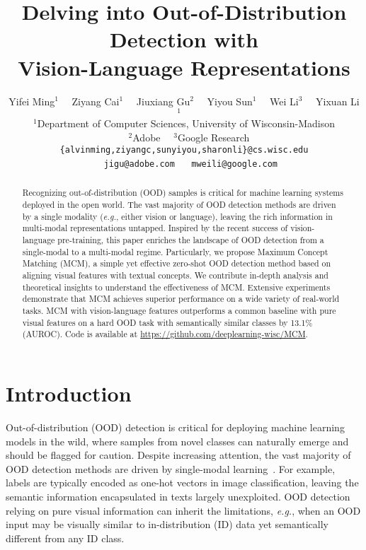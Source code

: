 \documentclass{article}
\title{Delving into Out-of-Distribution Detection with\\ Vision-Language Representations}
\author{Yifei Ming$^1\quad$ Ziyang Cai$^1\quad$ Jiuxiang Gu$^2\quad$  Yiyou Sun$^1\quad$ Wei Li$^3\quad$ Yixuan Li$^1\quad$  \\
  $^1$Department of Computer Sciences, University of Wisconsin-Madison\\ $\quad^2$Adobe $\quad^3$Google Research\\
  \texttt{\{alvinming,ziyangc,sunyiyou,sharonli\}@cs.wisc.edu}\\
 $\quad$ \texttt{jigu@adobe.com} $\quad$ \texttt{mweili@google.com} 
}
\begin{document}
\maketitle

\begin{abstract}
Recognizing out-of-distribution (OOD) samples is critical for machine learning systems deployed in the open world. The vast majority of OOD detection methods are driven by a single modality (\textit{e.g.}, either vision or language), leaving the rich information in multi-modal representations untapped.
Inspired by the recent success of vision-language pre-training, this paper enriches the landscape of OOD detection from a single-modal to a multi-modal regime. Particularly, we propose Maximum Concept Matching (MCM), a simple yet effective zero-shot OOD detection method based on aligning visual features with textual concepts.  We contribute in-depth analysis and theoretical insights to understand the effectiveness of MCM.
Extensive experiments demonstrate that MCM achieves superior performance on a wide variety of real-world tasks. MCM with vision-language features outperforms a common baseline with pure visual features on a hard OOD task with semantically similar classes by 13.1\% (AUROC). Code is available at \url{https://github.com/deeplearning-wisc/MCM}. 
\end{abstract}


\section{Introduction}

Out-of-distribution (OOD) detection is critical for deploying machine learning models in the wild, where samples from novel classes can naturally emerge and should be flagged for caution. Despite increasing attention, the vast majority of OOD detection methods are driven by single-modal learning~\cite{hendrycks-etal-2020-pretrained,hsu2020generalized,jin2022towards,shen2021enhancing,xu-etal-2021-unsupervised,zhan2021out,zheng2020out,zhou2021contrastive}.
For example, labels are typically encoded as one-hot vectors in image classification, 
leaving the semantic information encapsulated in texts largely unexploited. 
OOD detection relying on pure visual information can inherit the limitations, \emph{e.g.}, when an OOD input may be visually similar to  in-distribution (ID) data yet semantically different from any ID class.  
\end{document}
